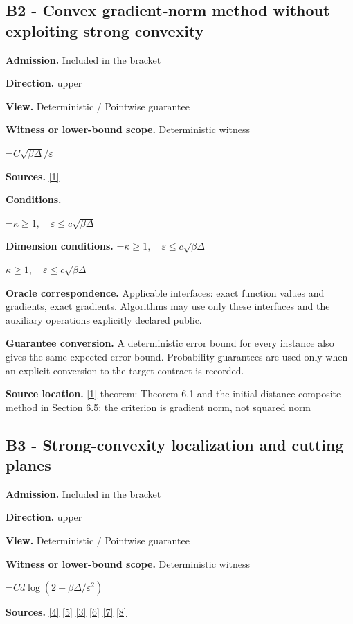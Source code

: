 \documentclass[10pt,a4paper]{article}
\newcommand{\AtlasMath}[1]{\par\begingroup\centering\setbox0=\hbox{$\displaystyle #1$}\ifdim\wd0>1.4\linewidth\typeout{ATLAS WIDE FORMULA: \the\wd0}\fi\ifdim\wd0>\linewidth\resizebox{\linewidth}{!}{\box0}\else\box0\fi\par\endgroup}
\newcommand{\AtlasInlineMath}[1]{\begingroup\setbox0=\hbox{$#1$}\ifdim\wd0>.4\linewidth\endgroup\AtlasMath{#1}\else\endgroup$#1$\fi}
\begin{document}
\subsection{B2 - Convex gradient-norm method without exploiting strong convexity}
\textbf{Admission.} Included in the bracket

\textbf{Direction.} upper

\textbf{View.} Deterministic / Pointwise guarantee

\textbf{Witness or lower-bound scope.} Deterministic witness

\AtlasMath{C\sqrt{\beta\Delta}/\varepsilon}
\textbf{Sources.} \href{https://arxiv.org/pdf/1803.06600v4}{[1]}

\textbf{Conditions.} 
\AtlasMath{\kappa\ge1,\quad\varepsilon\le c\sqrt{\beta\Delta}}


\textbf{Dimension conditions.} \AtlasInlineMath{\kappa\ge1,\quad\varepsilon\le c\sqrt{\beta\Delta}}

\textbf{Oracle correspondence.} Applicable interfaces: exact function values and gradients, exact gradients. Algorithms may use only these interfaces and the auxiliary operations explicitly declared public.

\textbf{Guarantee conversion.} A deterministic error bound for every instance also gives the same expected-error bound. Probability guarantees are used only when an explicit conversion to the target contract is recorded.

\textbf{Source location.} \href{https://arxiv.org/pdf/1803.06600v4}{[1]} theorem: Theorem 6.1 and the initial-distance composite method in Section 6.5; the criterion is gradient norm, not squared norm

\subsection{B3 - Strong-convexity localization and cutting planes}
\textbf{Admission.} Included in the bracket

\textbf{Direction.} upper

\textbf{View.} Deterministic / Pointwise guarantee

\textbf{Witness or lower-bound scope.} Deterministic witness

\AtlasMath{Cd\log(2+\beta\Delta/\varepsilon^2)}
\textbf{Sources.} \href{https://arxiv.org/pdf/2101.09740v2}{[4]} \href{https://arxiv.org/pdf/2609.33360v2}{[5]} \href{https://arxiv.org/pdf/2609.10874}{[3]} \href{https://arxiv.org/pdf/1405.4980}{[6]} \href{https://www2.isye.gatech.edu/~nemirovs/MOR_AccuracyCertificates.pdf}{[7]} \href{https://arxiv.org/pdf/2609.20701}{[8]}
\end{document}
